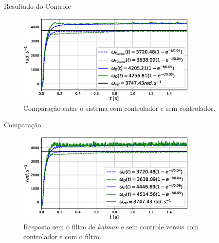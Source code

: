 \begin{frame}{Resultado do Controle}

    \begin{figure}
        \centering
        \includegraphics[width=0.8\textwidth]{figuras/resultados/exp02/controlador_vs_sem_controlador100.eps}
        \caption{Comparação entre o sistema com controlador e sem controlador.}
    \end{figure}
    
\end{frame}

\begin{frame}{Comparação}
    \begin{figure}
        \centering
        \includegraphics[width=0.8\textwidth]{figuras/resultados/exp02/antes_vs_depois100.eps}
        \caption{Resposta sem o filtro de \emph{kalman} e sem controle versus com controlador e com o filtro.}
    \end{figure}
\end{frame}